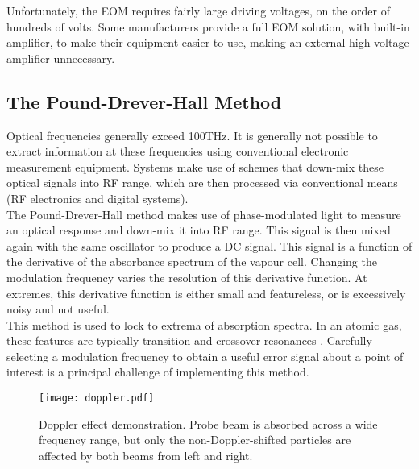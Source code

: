 Unfortunately, the EOM requires fairly large driving voltages, on the order of hundreds of volts.  Some manufacturers provide a full EOM solution, with built-in amplifier, to make their equipment easier to use, making an external high-voltage amplifier unnecessary.

\subsection{The Pound-Drever-Hall Method}

Optical frequencies generally exceed 100THz. It is generally not possible to
extract information at these frequencies using conventional
electronic measurement equipment.  Systems make use of
schemes that down-mix these optical signals into RF range, which are then
processed via conventional means (RF electronics and digital systems). \\

The Pound-Drever-Hall method makes use of phase-modulated light to measure an
optical response and down-mix it into RF range.  This signal is then mixed again with the same oscillator to produce a DC signal.  This signal is a function of the derivative of the absorbance spectrum of the vapour cell.  Changing the modulation frequency varies the resolution of this derivative function.  At extremes, this derivative function is either small and featureless, or is excessively noisy and not useful. \\

This method is used to lock to extrema of absorption spectra.  In an atomic gas, these features are typically transition and crossover resonances \cite{maguire2006}. Carefully selecting a modulation frequency to obtain a useful error signal about a point of interest is a principal challenge of implementing this method.

\begin{figure}
    \centering
    \texttt{[image: doppler.pdf]}
    \caption{Doppler effect demonstration.  Probe beam is absorbed across a wide frequency range, but only the non-Doppler-shifted particles are affected by both beams from left and right.}
    \label{fig:doppler}
\end{figure}

